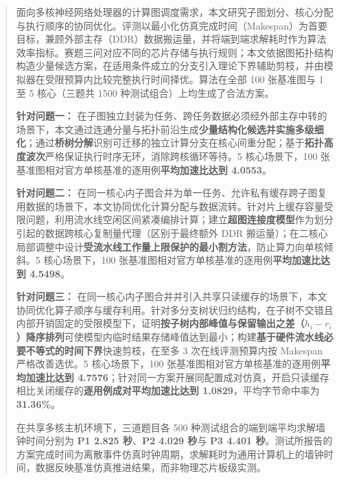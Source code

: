 \documentclass[anonymous,withtoc]{gmcm2026}
\begin{document}
\maketitle

\begin{abstract}
面向多核神经网络处理器的计算图调度需求，本文研究子图划分、核心分配与执行顺序的协同优化。评测以最小化仿真完成时间（Makespan）为首要目标，兼顾外部主存（DDR）数据搬运量，并将端到端求解耗时作为算法效率指标。赛题三问对应不同的芯片存储与执行规则；本文依据图拓扑结构构造少量候选方案，在适用条件成立的分支引入理论下界辅助剪枝，并由模拟器在受限预算内比较完整执行时间择优。算法在全部 100 张基准图与 1 至 5 核心（三题共 1500 种测试组合）上均生成了合法方案。

\textbf{针对问题一：} 在子图独立封装为任务、跨任务数据必须经外部主存中转的场景下，本文通过连通分量与拓扑前沿生成\textbf{少量结构化候选并实施多级细化}；通过\textbf{桥树分解}识别可迁移的独立计算分支在核心间重分配；基于\textbf{拓扑高度波次}严格保证执行时序无环，消除跨核循环等待。5 核心场景下，100 张基准图相对官方单核基准的逐用例\textbf{平均加速比达到 4.0553}。

\textbf{针对问题二：} 在同一核心内子图合并为单一任务、允许私有缓存跨子图复用数据的场景下，本文协同优化计算分配与数据流转。针对片上缓存容量受限问题，利用流水线空闲区间紧凑编排计算；建立\textbf{超图连接度模型}作为划分引起的数据跨核心复制量代理（区别于最终额外 DDR 搬运量）；在二核心局部调整中设计\textbf{受流水线工作量上限保护的最小割方法}，防止算力向单核倾斜。5 核心场景下，100 张基准图相对官方单核基准的逐用例\textbf{平均加速比达到 4.5498}。

\textbf{针对问题三：} 在同一核心内子图合并并引入共享只读缓存的场景下，本文协同优化算子顺序与缓存利用。针对多分支树状归约结构，在子树不交错且内部开销固定的受限模型下，证明\textbf{按子树内部峰值与保留输出之差（\(h_i - r_i\)）降序排列}可使模型内临时结果存储峰值达到最小；构建\textbf{基于硬件流水线必要不等式的时间下界}快速剪枝，在至多 3 次在线评测预算内按 Makespan 严格改善选优。5 核心场景下，100 张基准图相对官方单核基准的逐用例\textbf{平均加速比达到 4.7576}；针对同一方案开展同配置成对仿真，开启只读缓存相比关闭缓存的\textbf{逐用例成对平均加速比达到 1.0829}，平均字节命中率为 \textbf{31.36\%}。

在共享多核主机环境下，三道题目各 500 种测试组合的端到端平均求解墙钟时间分别为 \textbf{P1 2.825 秒}、\textbf{P2 4.029 秒}与 \textbf{P3 4.401 秒}。测试所报告的方案完成时间为离散事件仿真时钟周期，求解耗时为通用计算机上的墙钟时间，数据反映基准仿真推进结果，而非物理芯片板级实测。
\end{abstract}
\maketoc
\end{document}
